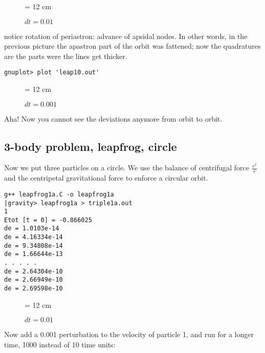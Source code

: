 \begin{figure}
\begin{center}
\leavevmode
\epsfxsize = 12 cm
\caption{$dt = 0.01$}
\label{fig:leap1}
\end{center}
\end{figure}

notice rotation of periastron: advance of apsidal nodes.
In other words, in the previous picture the apastron part of the orbit
was fattened; now the quadratures are the parts were the lines get thicker.

\begin{verbatim}
gnuplot> plot 'leap10.out'
\end{verbatim}

\begin{figure}
\begin{center}
\leavevmode
\epsfxsize = 12 cm
\caption{$dt = 0.001$}
\label{fig:leap10}
\end{center}
\end{figure}

Aha!  Now you cannot see the deviations anymore from orbit to orbit.

\subsection{3-body problem, leapfrog, circle}

Now we put three particles on a circle.  We use the balance of
centrifugal force $ \frac{v^2}{r} $ and the centripetal gravitational
force to enforce a circular orbit.



\begin{verbatim}
g++ leapfrog1a.C -o leapfrog1a
|gravity> leapfrog1a > triple1a.out
1
Etot [t = 0] = -0.866025
de = 1.0103e-14
de = 4.16334e-14
de = 9.34808e-14
de = 1.66644e-13
. . . . .
de = 2.64304e-10
de = 2.66949e-10
de = 2.69598e-10
\end{verbatim}

\begin{figure}
\begin{center}
\leavevmode
\epsfxsize = 12 cm
\caption{$dt = 0.01$}
\label{fig:triple1a}
\end{center}
\end{figure}

Now add a 0.001 perturbation to the velocity of particle 1, and run
for a longer time, 1000 instead of 10 time units:

